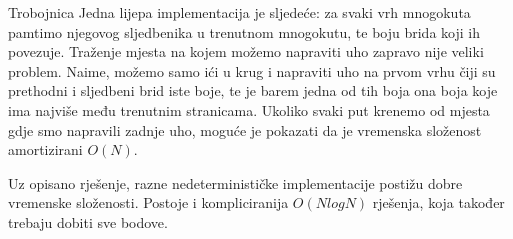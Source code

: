 \begin{statement}[
  problempoints=110,
  timelimit=1 second,
  memorylimit=512 MiB,
]{Trobojnica}
Jedna lijepa implementacija je sljedeće: za svaki vrh mnogokuta pamtimo njegovog sljedbenika u
trenutnom mnogokutu, te boju brida koji ih povezuje. Traženje mjesta na kojem možemo napraviti
uho zapravo nije veliki problem.
Naime, možemo samo ići u krug i napraviti uho na prvom vrhu čiji su prethodni i sljedbeni brid
iste boje, te je barem jedna od tih boja ona boja koje ima najviše među trenutnim stranicama.
Ukoliko svaki put krenemo od mjesta gdje smo napravili zadnje uho, moguće je pokazati da
je vremenska složenost amortizirani $O(N)$.

Uz opisano rješenje, razne nedeterminističke implementacije postižu dobre vremenske složenosti.
Postoje i kompliciranija $O(N log N)$ rješenja, koja također trebaju dobiti sve bodove.

\end{statement}

